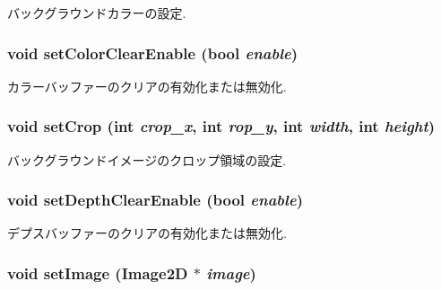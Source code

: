 バックグラウンドカラーの設定. \hypertarget{classm3g_1_1Background_68e4fe4cf32fe60f166056115081aa65}{
\subsubsection[{setColorClearEnable}]{\setlength{\rightskip}{0pt plus 5cm}void setColorClearEnable (bool {\em enable})}}
\label{classm3g_1_1Background_68e4fe4cf32fe60f166056115081aa65}


カラーバッファーのクリアの有効化または無効化. \hypertarget{classm3g_1_1Background_e543ac6196bbe65a7af8e6b8686441a7}{
\subsubsection[{setCrop}]{\setlength{\rightskip}{0pt plus 5cm}void setCrop (int {\em crop\_\-x}, \/  int {\em rop\_\-y}, \/  int {\em width}, \/  int {\em height})}}
\label{classm3g_1_1Background_e543ac6196bbe65a7af8e6b8686441a7}


バックグラウンドイメージのクロップ領域の設定. \hypertarget{classm3g_1_1Background_0953a713c22fd40cd586bcd8af80075a}{
\subsubsection[{setDepthClearEnable}]{\setlength{\rightskip}{0pt plus 5cm}void setDepthClearEnable (bool {\em enable})}}
\label{classm3g_1_1Background_0953a713c22fd40cd586bcd8af80075a}


デプスバッファーのクリアの有効化または無効化. \hypertarget{classm3g_1_1Background_705b89b41cd1b38f664ed912be44baaa}{
\subsubsection[{setImage}]{\setlength{\rightskip}{0pt plus 5cm}void setImage ({\bf Image2D} $\ast$ {\em image})}}
\label{classm3g_1_1Background_705b89b41cd1b38f664ed912be44baaa}


